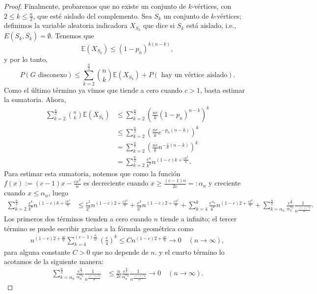 \documentclass[12pt]{report}
\theoremstyle{plain}
\theoremstyle{definition}
\renewcommand{\bar}[1]{\overline{#1}}
\begin{document}
\begin{proof}
\bigskip


Finalmente, probaremos que no existe un conjunto de $k$-vértices, con $2 \leq k \leq \frac n 2$, que esté aislado del complemento. Sea $S_k$ un conjunto de $k$-vértices; definimos la variable aleatoria indicadora $X_{S_k}$ que dice si $S_k$ está aislado, i.e., $E(S_k, \bar{S_k}) = \emptyset$. Tenemos que
\[
    \mathbb{E} (X_{S_k}) \leq (1 - p_n)^{k (n-k)} ,
\]
y por lo tanto,
\[
    P( G \text{ disconexo}) \leq \sum_{k = 2}^{\frac n 2} \binom n k \mathbb{E}(X_{S_k}) + P(\text{ hay un vértice aislado}).
\]
Como el último término ya vimos que tiende a cero cuando $c > 1$, basta estimar la sumatoria. Ahora,
\begin{align*}
\sum_{k = 2}^{\frac n 2} \binom n k \mathbb{E} (X_{S_k}) &\leq \sum_{k = 2}^{\frac n 2} \left (\frac{ne}{k} (1-p_n)^{n-k} \right )^k \\
&\leq \sum_{k = 2}^{\frac n 2} \left (\frac{ne}{k} e^{-p_n(n-k)} \right )^k \\
&= \sum_{k = 2}^{\frac n 2} \left ( \frac{n e}{k} n^{- \frac c n (n-k)} \right )^k \\
&= \sum_{k = 2}^{\frac n 2}  \frac{ e^k}{k^k} n^{(1- c)k +  \frac{c k^2}{n}}.
\end{align*}
Para estimar esta sumatoria, notemos que como la función $f(x) := (c-1)x - \frac{c x^2}{n}$ es decreciente cuando $x \geq \frac{(c-1)n}{2c} =: \alpha_n$ y creciente cuando $x \leq \alpha_n$, luego
\begin{align*}
\sum_{k = 2}^{\frac n 2}  \frac{ e^k}{k^k} n^{(1- c)k +  \frac{c k^2}{n}} &\leq \frac{e^2}{2^2} n^{(1-c) 2 + \frac{c 2^2}{n}} + \frac{e^3}{3^3} n^{(1-c) 2 + \frac{c 3^2}{n}} +\sum_{k = 4}^{k} \frac{e^{\alpha_n}}{4^k} n^{(1-c) 2 + \frac{c 2^2}{n}} + \sum_{k = \alpha_n}^{\frac{n}{2}} \frac{e^{\frac n 2}}{\alpha_n^{\alpha_n}} \frac{1}{n^{\frac{(c-1)^2 n}{4 c}}}.
\end{align*}
Los primeros dos términos tienden a cero cuando $n$ tiende a infinito; el tercer término se puede escribir gracias a la fórmula geométrica como
\begin{align*}
n^{(1-c)2 +\frac{4 c}{n}}\sum_{k = 4}^{(c-1) \frac{n}{2c}} (\frac{e}{4})^k \leq C n^{(1-c)2 + \frac{4c}{n}} \longrightarrow 0 \quad (n \to \infty),
\end{align*}
para alguna constante $C>0$ que no depende de $n$.
y el cuarto término lo acotamos de la siguiente manera:
\begin{align*}
\sum_{k = \alpha_n}^{\frac{n}{2}} \frac{e^{\frac n 2}}{\alpha_n^{\alpha_n}} \frac{1}{n^{\frac{(c-1)^2 n}{4 c}}} &\leq \frac{n}{2c} \frac{e^{\frac n 2}}{\alpha_n^{\alpha_n}} \frac{1}{n^{\frac{(c-1)^2n}{4c}}} \longrightarrow 0 \quad (n \to \infty).
\end{align*}

\end{proof}
\end{document}
